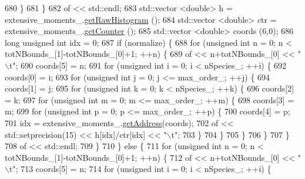\begin{DoxyCode}
680         \}
681     \}
682     of << std::endl;
683     std::vector <double> h = extensive\_moments\_.\hyperlink{classhistogram_afa81289dc32207eb3c44f8bd746f0d1d}{getRawHistogram} ();
684     std::vector <double> ctr = extensive\_moments\_.\hyperlink{classhistogram_a7d3541bd86551053f9fda7b5ae81e3e8}{getCounter} ();
685     std::vector <double> coords (6,0);
686     \textcolor{keywordtype}{long} \textcolor{keywordtype}{unsigned} \textcolor{keywordtype}{int} idx = 0;
687     \textcolor{keywordflow}{if} (normalize) \{
688         \textcolor{keywordflow}{for} (\textcolor{keywordtype}{unsigned} \textcolor{keywordtype}{int} n = 0; n < totNBounds\_[1]-totNBounds\_[0]+1; ++n) \{
689             of << n+totNBounds\_[0] << \textcolor{stringliteral}{"\(\backslash\)t"};
690             coords[5] = n;
691             \textcolor{keywordflow}{for} (\textcolor{keywordtype}{unsigned} \textcolor{keywordtype}{int} i = 0; i < nSpecies\_; ++i) \{
692                 coords[0] = i;
693                 \textcolor{keywordflow}{for} (\textcolor{keywordtype}{unsigned} \textcolor{keywordtype}{int} j = 0; j <= max\_order\_; ++j) \{
694                     coords[1] = j;
695                     \textcolor{keywordflow}{for} (\textcolor{keywordtype}{unsigned} \textcolor{keywordtype}{int} k = 0; k < nSpecies\_; ++k) \{
696                         coords[2] = k;
697                         \textcolor{keywordflow}{for} (\textcolor{keywordtype}{unsigned} \textcolor{keywordtype}{int} m = 0; m <= max\_order\_; ++m) \{
698                             coords[3] = m;
699                             \textcolor{keywordflow}{for} (\textcolor{keywordtype}{unsigned} \textcolor{keywordtype}{int} p = 0; p <= max\_order\_; ++p) \{
700                                 coords[4] = p;
701                                 idx = extensive\_moments\_.\hyperlink{classhistogram_ae52fa58934b56e05846a66e43c3184bd}{getAddress}(coords);
702                                 of << std::setprecision(15) << h[idx]/ctr[idx] << \textcolor{stringliteral}{"\(\backslash\)t"};
703                             \}
704                         \}
705                     \}
706                 \}
707             \}
708             of << std::endl;
709         \}
710     \} \textcolor{keywordflow}{else} \{
711         \textcolor{keywordflow}{for} (\textcolor{keywordtype}{unsigned} \textcolor{keywordtype}{int} n = 0; n < totNBounds\_[1]-totNBounds\_[0]+1; ++n) \{
712             of << n+totNBounds\_[0] << \textcolor{stringliteral}{"\(\backslash\)t"};
713             coords[5] = n;
714             \textcolor{keywordflow}{for} (\textcolor{keywordtype}{unsigned} \textcolor{keywordtype}{int} i = 0; i < nSpecies\_; ++i) \{

\end{DoxyCode}
